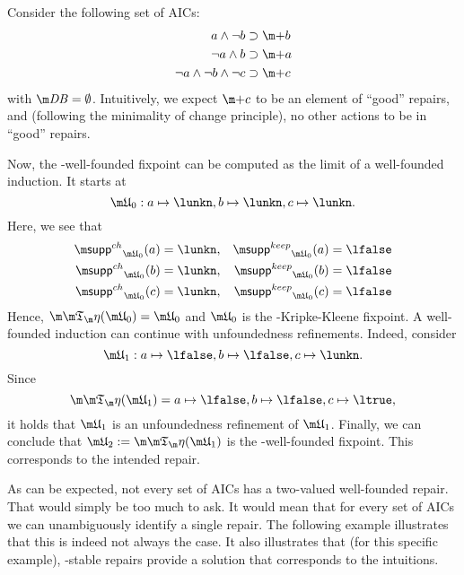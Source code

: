 \begin{example}
 Consider the following set \aics of AICs:
\begin{align*}
 a \land \lnot b&\aicrule \add b \\
 \lnot a \land b &\aicrule \add a \\
 \lnot a \land \lnot b \land \lnot c &\aicrule \add c
 \end{align*} with $\db = \emptyset$. Intuitively, we expect $\add c$ to be an element of ``good'' repairs, and (following the minimality of change principle), no other actions to be in ``good'' repairs. 

Now, the \Ap-well-founded fixpoint can be computed as the limit of a well-founded induction. It starts at
\[\UUU_0: a\mapsto \lunkn, b\mapsto \lunkn, c\mapsto\lunkn.\]
Here, we see that 
\begin{align*}
 \suppin_{\UUU_0}(a) &= \lunkn, & \suppout_{\UUU_0}(a) &=\lfalse \\
 \suppin_{\UUU_0}(b) &= \lunkn, & \suppout_{\UUU_0}(b) &=\lfalse \\
 \suppin_{\UUU_0}(c) &= \lunkn, & \suppout_{\UUU_0}(c) &=\lfalse 
\end{align*}
Hence, $\Ap(\UUU_0)=\UUU_0$ and $\UUU_0$ is the \Ap-Kripke-Kleene fixpoint. 
A well-founded induction can continue with unfoundedness refinements. Indeed, consider 
\[\UUU_1: a\mapsto \lfalse, b\mapsto \lfalse, c\mapsto\lunkn.\]
Since 
\[\Ap(\UUU_1) = a\mapsto \lfalse, b\mapsto \lfalse, c\mapsto \ltrue,\] it holds that $\UUU_1$ is an unfoundedness refinement of $\UUU_1$. 
Finally, we can conclude that $\UUU_2:=\Ap(\UUU_1)$ is the \Ap-well-founded fixpoint. This corresponds to the intended repair.
\end{example}

As can be expected, not every set of AICs has a two-valued well-founded repair. That would simply be too much to ask. It would mean that for every set of AICs we can unambiguously identify a single repair. The following example illustrates that this is indeed not always the case. It also illustrates that (for this specific example), \Ap-stable repairs provide a solution that corresponds to the intuitions. 

